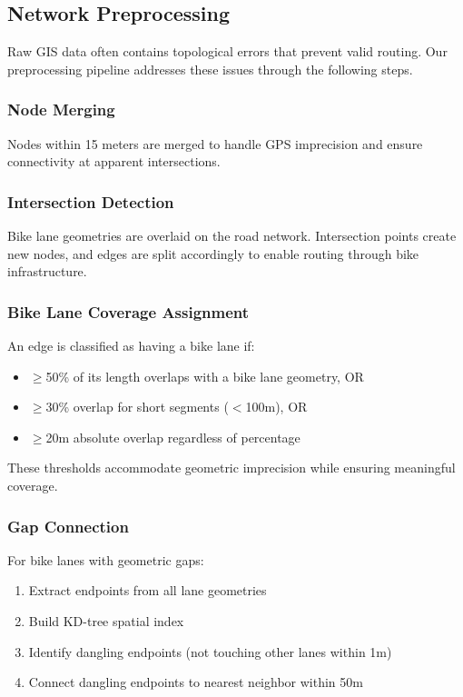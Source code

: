 \documentclass[12pt,a4paper]{article}
\begin{document}
\subsection{Network Preprocessing}

Raw GIS data often contains topological errors that prevent valid routing. Our preprocessing pipeline addresses these issues through the following steps.

\subsubsection{Node Merging}

Nodes within 15 meters are merged to handle GPS imprecision and ensure connectivity at apparent intersections.

\subsubsection{Intersection Detection}

Bike lane geometries are overlaid on the road network. Intersection points create new nodes, and edges are split accordingly to enable routing through bike infrastructure.

\subsubsection{Bike Lane Coverage Assignment}

An edge is classified as having a bike lane if:
\begin{itemize}
    \item $\geq$50\% of its length overlaps with a bike lane geometry, OR
    \item $\geq$30\% overlap for short segments ($<$100m), OR
    \item $\geq$20m absolute overlap regardless of percentage
\end{itemize}

These thresholds accommodate geometric imprecision while ensuring meaningful coverage.

\subsubsection{Gap Connection}

For bike lanes with geometric gaps:
\begin{enumerate}
    \item Extract endpoints from all lane geometries
    \item Build KD-tree spatial index
    \item Identify dangling endpoints (not touching other lanes within 1m)
    \item Connect dangling endpoints to nearest neighbor within 50m
\end{enumerate}
\end{document}
